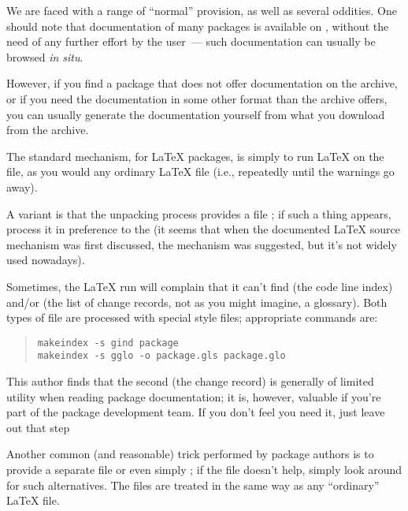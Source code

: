 
We are faced with a range of ``normal'' provision, as well as several
oddities.  One should note that documentation of many packages is
available on , without the need of any further effort by
the user~--- such documentation can usually be browsed \emph{in situ}.

However, if you find a package that does not offer documentation on
the archive, or if you need the documentation in some other format
than the archive offers, you can usually generate the documentation
yourself from what you download from the archive.

The standard mechanism, for \LaTeX{} packages, is simply to run
\LaTeX{} on the  file, as you would any ordinary
\LaTeX{} file (i.e., repeatedly until the warnings go away).

A variant is that the unpacking process provides a file
; if such a thing appears, process it in preference
to the  (it seems that when the documented \LaTeX{}
source mechanism was first discussed, the  mechanism was
suggested, but it's not widely used nowadays).

Sometimes, the \LaTeX{} run will complain that it can't find
 (the code line index) and/or 
(the list of change records, not as you might imagine, a glossary).
Both types of file are processed with special 
style files; appropriate commands are:
\begin{quote}
\begin{verbatim}
makeindex -s gind package
makeindex -s gglo -o package.gls package.glo
\end{verbatim}
\end{quote}
This author finds that the second (the change record) is generally of
limited utility when reading package documentation; it is, however,
valuable if you're part of the package development team.  If you don't
feel you need it, just leave out that step

Another common (and reasonable) trick performed by package authors is
to provide a separate file  or even simply
; if the file  doesn't help, simply
look around for such alternatives.  The files are treated in the same
way as any ``ordinary'' \LaTeX{} file.


